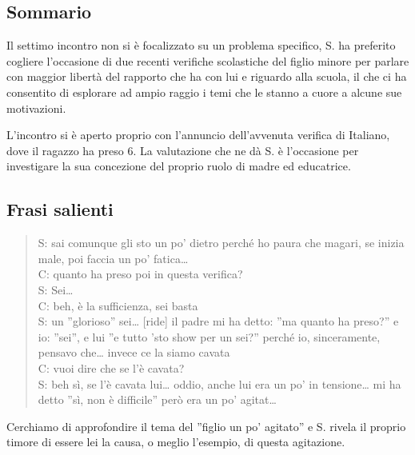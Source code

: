 \subsection*{Sommario}

Il settimo incontro non si è focalizzato su un problema specifico, S. ha preferito cogliere l'occasione di due recenti verifiche scolastiche del figlio minore per parlare con maggior libertà del rapporto che ha con lui e riguardo alla scuola, il che ci ha consentito di esplorare ad ampio raggio  i temi che le stanno a cuore a alcune sue motivazioni. 

L'incontro si è aperto proprio con l'annuncio dell'avvenuta verifica di Italiano, dove il ragazzo ha preso 6. La valutazione che ne dà S. è l'occasione per investigare la sua concezione del proprio ruolo di madre ed educatrice. 

\subsection*{Frasi salienti}

\begin{verse}
S: sai comunque gli sto un po' dietro perché ho paura che magari, se inizia male, poi faccia un po' fatica\ldots{}  \\
C: quanto ha preso poi in questa verifica?\\
S: Sei\ldots{}  \\
C: beh, è la sufficienza, sei basta\\
S: un ''glorioso'' sei\ldots{}   [ride] il padre mi ha detto: ''ma quanto ha preso?'' e io: ''sei'', e lui ''e tutto 'sto show per un sei?'' perché io, sinceramente, pensavo che\ldots{}   invece ce la siamo cavata\\
C: vuoi dire che se l'è cavata?\\
S: beh sì, se l'è cavata lui\ldots{}   oddio, anche lui era un po' in tensione\ldots{}   mi ha detto ''sì, non è difficile'' però era un po' agitat\ldots{}  
\end{verse}

\noindent Cerchiamo di approfondire il tema del ''figlio un po' agitato'' e S. rivela il proprio timore di essere lei la causa, o meglio l'esempio, di questa agitazione.

